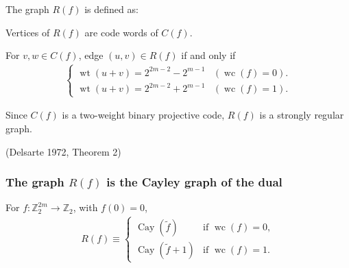 \documentclass[pdf,sprung,slideColor,nocolorBG]{beamer}
\newenvironment{colortheme}[1]{
\def\ProvidesPackageRCS $##1${\relax}
\renewcommand{\ProcessOptions}{\relax}
\makeatletter

\makeatother
}{}
\newcommand{\slidecite}[1]{\tiny{(#1)}\normalsize{}}
\newcommand{\mb}[1]{\mathbb{#1}}
\newcommand{\To}{\rightarrow}
\newcommand{\Cay}[1]{\operatorname{Cay}\left(#1\right)}
\newcommand{\dual}[1]{\widetilde{#1}}
\newcommand{\weight}[1]{\operatorname{wt}\left(#1\right)}
\newcommand{\weightclass}[1]{\operatorname{wc}\left(#1\right)}
\newcommand{\Z}{\mb{Z}}
\begin{document}
\begin{colortheme}{seagull}
\begin{frame}
\begin{Definition}
The graph $R(f)$ is defined as:

Vertices of $R(f)$ are code words of $C(f)$.

For $v,w \in C(f)$, edge $(u,v) \in R(f)$ if and only if
\begin{align*}
\begin{cases}
\weight{u+v} = 2^{2m-2} - 2^{m-1} & (\weightclass{f}=0).
\\
\weight{u+v} = 2^{2m-2} + 2^{m-1} & (\weightclass{f}=1).
\end{cases}
\end{align*}
 
\end{Definition}
Since $C(f)$ is a two-weight binary projective code, 
$R(f)$ is a strongly regular graph.
 
\slidecite{Delsarte 1972, Theorem 2}
\end{frame}
\end{colortheme}

\begin{colortheme}{jubata}
\begin{frame}
\frametitle{The graph $R(f)$ is the Cayley graph of the dual}

\begin{Theorem}
For $f : \Z_2^{2m} \To \Z_2$, with $f(0)=0$,
\begin{align*}
R(f) \equiv 
\begin{cases}
\Cay{\dual{f}} & \text{if~} \weightclass{f}=0,
\\
\Cay{\dual{f}+1} & \text{if~} \weightclass{f}=1.
\end{cases}
\end{align*}
 
\end{Theorem}
\end{frame}
\end{colortheme}
\end{document}

